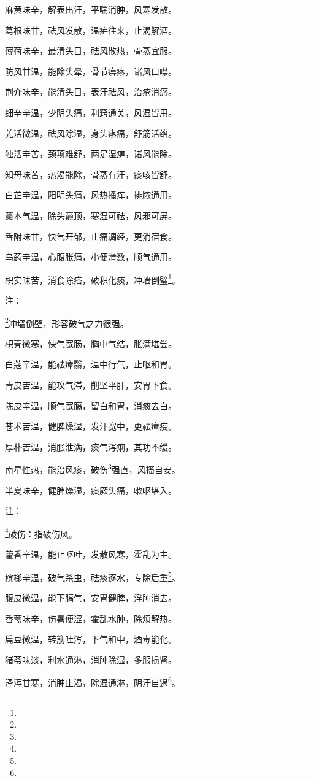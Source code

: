 \documentclass[a4paper,12pt,UTF8,twoside]{ctexbook}
\begin{document}
麻黄味辛，解表出汗，平喘消肿，风寒发散。

葛根味甘，祛风发散，温疟往来，止渴解酒。

薄荷味辛，最清头目，祛风散热，骨蒸宜服。

防风甘温，能除头晕，骨节痹疼，诸风口噤。

荆介味辛，能清头目，表汗祛风，治疮消瘀。

细辛辛温，少阴头痛，利窍通关，风湿皆用。

羌活微温，祛风除湿，身头疼痛，舒筋活络。

独活辛苦，颈项难舒，两足湿痹，诸风能除。

知母味苦，热渴能除，骨蒸有汗，痰咳皆舒。

白芷辛温，阳明头痛，风热搔痒，排脓通用。

藁本气温，除头巅顶，寒湿可祛，风邪可屏。

香附味甘，快气开郁，止痛调经，更消宿食。

乌药辛温，心腹胀痛，小便滑数，顺气通用。

枳实味苦，消食除痞，破积化痰，冲墙倒璧\footnote{}。

注：

\footnote{}冲墙倒壁，形容破气之力很强。

枳壳微寒，快气宽肠，胸中气结，胀满堪尝。

白蔻辛温，能祛瘴翳，温中行气，止呕和胃。

青皮苦温，能攻气滞，削坚平肝，安胃下食。

陈皮辛温，顺气宽膈，留白和胃，消痰去白。

苍术苦温，健脾燥湿，发汗宽中，更祛瘴疫。

厚朴苦温，消胀泄满，痰气泻痢，其功不缓。

南星性热，能治风痰，破伤\footnote{}强直，风搐自安。

半夏味辛，健脾燥湿，痰厥头痛，嗽呕堪入。

注：

\footnote{}破伤：指破伤风。

藿香辛温，能止呕吐，发散风寒，霍乱为主。

槟榔辛温，破气杀虫，祛痰逐水，专除后重\footnote{}。

腹皮微温，能下膈气，安胃健脾，浮肿消去。

香薷味辛，伤暑便涩，霍乱水肿，除烦解热。

扁豆微温，转筋吐泻，下气和中，酒毒能化。

猪苓味淡，利水通淋，消肿除湿，多服损肾。

泽泻甘寒，消肿止渴，除湿通淋，阴汗自遏\footnote{}。
\end{document}
